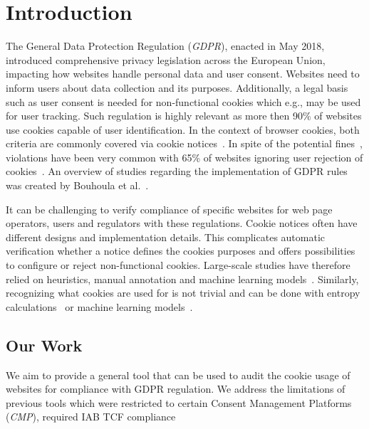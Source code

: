 \chapter{Introduction} \label{chap:introduction}

The General Data Protection Regulation (\emph{GDPR}), enacted in May 2018, introduced comprehensive privacy legislation across the European Union, impacting how websites handle personal data and user consent.
Websites need to inform users about data collection and its purposes.
Additionally, a legal basis such as user consent is needed for non-functional cookies which e.g., may be used for user tracking.
Such regulation is highly relevant as more then 90\% of websites use cookies capable of user identification.
In the context of browser cookies, both criteria are commonly covered via cookie notices~\cite{bouhoula2023automated}.
In spite of the potential fines~\cite{sanchez_rola2019can}, violations have been very common with 65\% of websites ignoring user rejection of cookies~\cite{bouhoula2023automated}.
An overview of studies regarding the implementation of GDPR rules was created by Bouhoula et al.~\cite{bouhoula2023automated}.

It can be challenging to verify compliance of specific websites for web page operators, users and regulators with these regulations.
Cookie notices often have different designs and implementation details.
This complicates automatic verification whether a notice defines the cookies purposes and offers possibilities to configure or reject non-functional cookies.
Large-scale studies have therefore relied on heuristics, manual annotation and machine learning models~\cite{kretschmer2021cookie, bouhoula2023automated}.
Similarly, recognizing what cookies are used for is not trivial and can be done with entropy calculations~\cite{sanchez_rola2019can} or machine learning models~\cite{bollinger2022automating}.

\section{Our Work}
We aim to provide a general tool that can be used to audit the cookie usage of websites for compliance with GDPR regulation.
We address the limitations of previous tools which were restricted to certain Consent Management Platforms (\emph{CMP}), required IAB TCF compliance~\cite{matte2020cookiebannersrespectchoice}